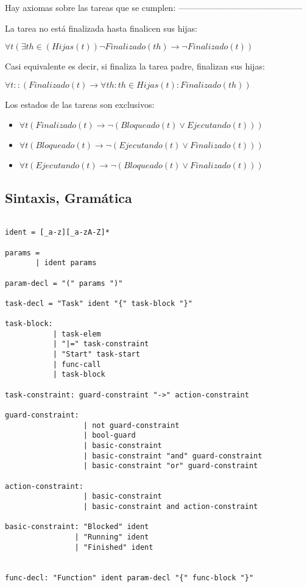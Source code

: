 Hay axiomas sobre las tareas que se cumplen:
--------------------------------------------

La tarea no está finalizada hasta finalicen sus hijas:

$\forall t (\exists th \in (Hijas(t)) \neg Finalizado(th) \rightarrow \neg Finalizado(t))$

Casi equivalente es decir, si finaliza la tarea padre, finalizan sus hijas:

$\forall t :: (Finalizado(t) \rightarrow \forall th : th \in Hijas(t) : Finalizado(th))$

Los estados de las tareas son exclusivos:

\begin{itemize}
\item
$\forall t (Finalizado(t) \rightarrow \neg (Bloqueado(t) \lor Ejecutando(t)))$
\item
$\forall t (Bloqueado(t) \rightarrow \neg (Ejecutando(t) \lor Finalizado(t)))$
\item
$\forall t (Ejecutando(t) \rightarrow \neg (Bloqueado(t) \lor Finalizado(t)))$
\end{itemize}

\subsection{Sintaxis, Gramática}

\begin{verbatim}

ident = [_a-z][_a-zA-Z]*

params =
       | ident params

param-decl = "(" params ")"

task-decl = "Task" ident "{" task-block "}"

task-block:
           | task-elem
           | "|=" task-constraint
           | "Start" task-start
           | func-call
           | task-block

task-constraint: guard-constraint "->" action-constraint

guard-constraint:
                  | not guard-constraint
                  | bool-guard
                  | basic-constraint
                  | basic-constraint "and" guard-constraint
                  | basic-constraint "or" guard-constraint

action-constraint:
                  | basic-constraint
                  | basic-constraint and action-constraint

basic-constraint: "Blocked" ident
                | "Running" ident
                | "Finished" ident


func-decl: "Function" ident param-decl "{" func-block "}"

\end{verbatim}

